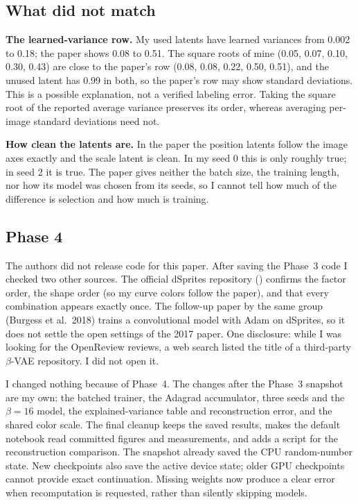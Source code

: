 \subsection{What did not match}
\textbf{The learned-variance row.} My used latents have learned variances from 0.002 to 0.18; the paper shows 0.08 to 0.51. The square roots of mine (0.05, 0.07, 0.10, 0.30, 0.43) are close to the paper's row (0.08, 0.08, 0.22, 0.50, 0.51), and the unused latent has 0.99 in both, so the paper's row may show standard deviations. This is a possible explanation, not a verified labeling error. Taking the square root of the reported average variance preserves its order, whereas averaging per-image standard deviations need not.

\textbf{How clean the latents are.} In the paper the position latents follow the image axes exactly and the scale latent is clean. In my seed 0 this is only roughly true; in seed 2 it is true. The paper gives neither the batch size, the training length, nor how its model was chosen from its seeds, so I cannot tell how much of the difference is selection and how much is training.

\subsection{Phase 4}
The authors did not release code for this paper. After saving the Phase~3 code I checked two other sources. The official dSprites repository () confirms the factor order, the shape order (so my curve colors follow the paper), and that every combination appears exactly once. The follow-up paper by the same group (Burgess et al.\ 2018) trains a convolutional model with Adam on dSprites, so it does not settle the open settings of the 2017 paper. One disclosure: while I was looking for the OpenReview reviews, a web search listed the title of a third-party $\beta$-VAE repository. I did not open it.

I changed nothing because of Phase~4. The changes after the Phase~3 snapshot are my own: the batched trainer, the Adagrad accumulator, three seeds and the $\beta=16$ model, the explained-variance table and reconstruction error, and the shared color scale. The final cleanup keeps the saved results, makes the default notebook read committed figures and measurements, and adds a script for the reconstruction comparison. The snapshot already saved the CPU random-number state. New checkpoints also save the active device state; older GPU checkpoints cannot provide exact continuation. Missing weights now produce a clear error when recomputation is requested, rather than silently skipping models.

